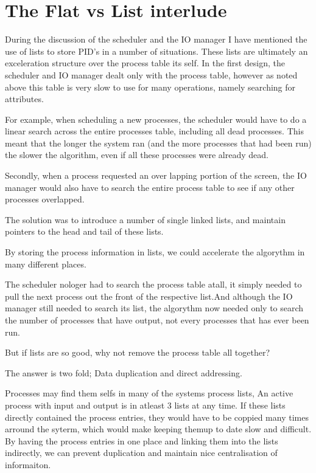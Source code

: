 \documentclass[a4paper]{report}
\begin{document}
\section{The Flat vs List interlude}

During the discussion of the scheduler and the IO manager I have mentioned the use of lists to store PID's in a number of situations. These lists are ultimately an exceleration structure over the process table its self. In the first design, the scheduler and IO manager dealt only with the process table, however as noted above this table is very slow to use for many operations, namely searching for attributes.

For example, when scheduling a new processes, the scheduler would have to do a linear search across the entire processes table, including all dead processes. This meant that the longer the system ran (and the more processes that had been run) the slower the algorithm, even if all these processes were already dead.

Secondly, when a process requested an over lapping portion of the screen, the IO manager would also have to search the entire process table to see if any other processes overlapped.

The solution was to introduce a number of single linked lists, and maintain pointers to the head and tail of these lists.

By storing the process information in lists, we could accelerate the algorythm in many different places.

The scheduler nologer had to search the process table atall, it simply needed to pull the next process out the front of the respective list.And although the IO manager still needed to search its list, the algorythm now needed only to search the number of processes that have output, not every processes that has ever  been run.


But if lists are so good, why not remove the process table all together?

The answer is two fold; Data duplication and direct addressing.

Processes may find them selfs in many of the systems process lists, An active process with input and output is in atleast 3 lists at any time. If these lists directly contained the process entries, they would have to be coppied many times arround the syterm, which would make keeping themup to date slow and difficult. By having the process entries in one place and linking them into the lists indirectly, we can prevent duplication and maintain nice centralisation of informaiton.
\end{document}
